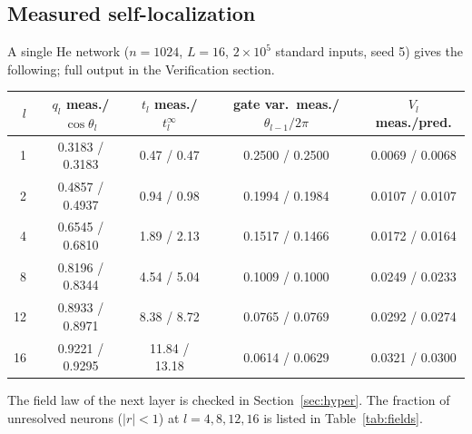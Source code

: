 \subsection{Measured self-localization}
A single He network ($n=1024$, $L=16$, $2\times10^5$ standard inputs, seed 5) gives the following; full output in the Verification section.
\begin{center}\small
\begin{tabular}{rcccc}\toprule
$l$ & $q_l$ meas./$\cos\theta_l$ & $t_l$ meas./$t_l^\infty$ & gate var.\ meas./$\theta_{l-1}/2\pi$ & $V_l$ meas./pred.\\\midrule
1 & 0.3183 / 0.3183 & 0.47 / 0.47 & 0.2500 / 0.2500 & 0.0069 / 0.0068\\
2 & 0.4857 / 0.4937 & 0.94 / 0.98 & 0.1994 / 0.1984 & 0.0107 / 0.0107\\
4 & 0.6545 / 0.6810 & 1.89 / 2.13 & 0.1517 / 0.1466 & 0.0172 / 0.0164\\
8 & 0.8196 / 0.8344 & 4.54 / 5.04 & 0.1009 / 0.1000 & 0.0249 / 0.0233\\
12 & 0.8933 / 0.8971 & 8.38 / 8.72 & 0.0765 / 0.0769 & 0.0292 / 0.0274\\
16 & 0.9221 / 0.9295 & 11.84 / 13.18 & 0.0614 / 0.0629 & 0.0321 / 0.0300\\
\bottomrule\end{tabular}
\end{center}
The field law of the next layer is checked in Section~\ref{sec:hyper}. The fraction of unresolved neurons ($|r|<1$) at $l=4,8,12,16$
is listed in Table~\ref{tab:fields}.
